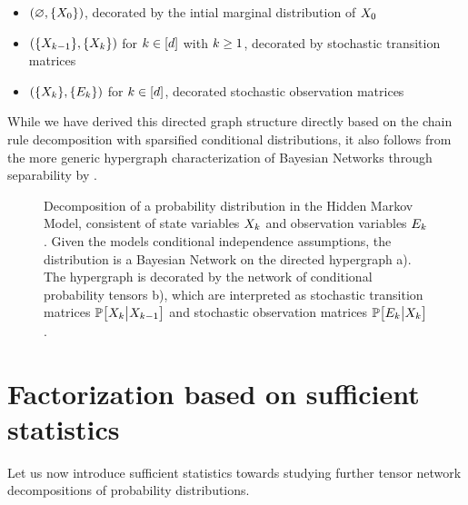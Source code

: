 \begin{example}
    \begin{itemize}
        \item $(\varnothing,\{X_{0}\})$, decorated by the intial marginal distribution of $X_{0}$
        \item $(\{X_{k-1}\}, \{X_{k}\})$ for $k\in[d]$ with $k\geq1$, decorated by stochastic transition matrices
        \item $(\{X_{k}\}, \{E_{k}\})$ for $k\in[d]$, decorated stochastic observation matrices
    \end{itemize}
    While we have derived this directed graph structure directly based on the chain rule decomposition with sparsified conditional distributions, it also follows from the more generic hypergraph characterization of Bayesian Networks through separability by .
\end{example}

\begin{figure}[t]
    \begin{center}
        
    \end{center}
    \caption{Decomposition of a probability distribution in the Hidden Markov Model, consistent of state variables $X_{k}$ and observation variables $E_{k}$.
    Given the models conditional independence assumptions, the distribution is a Bayesian Network on the directed hypergraph a).
    The hypergraph is decorated by the network of conditional probability tensors b), which are interpreted as stochastic transition matrices $\mathbb{P}\big[X_{k}\big|X_{k-1}\big]$ and stochastic observation matrices $\mathbb{P}\big[E_{k}\big|X_{k}\big]$.
    }
    \label{fig:HMM}
\end{figure}


\section{Factorization based on sufficient statistics}


Let us now introduce sufficient statistics towards studying further tensor network decompositions of probability distributions.

